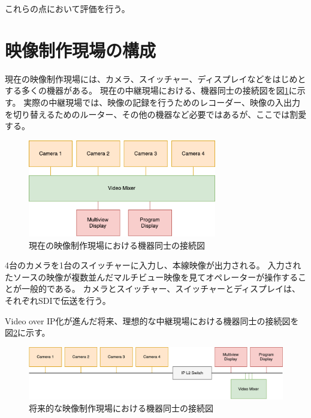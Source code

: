 これらの点において評価を行う。

\section{映像制作現場の構成}

現在の映像制作現場には、カメラ、スイッチャー、ディスプレイなどをはじめとする多くの機器がある。
現在の中継現場における、機器同士の接続図を図\ref{fig:broadcast-diagram-on-sdi}に示す。
実際の中継現場では、映像の記録を行うためのレコーダー、映像の入出力を切り替えるためのルーター、その他の機器など必要ではあるが、ここでは割愛する。

\begin{figure}[htbp]
  \begin{center}
    \includegraphics[bb=0 0 432 222,width=8.233cm]{img/broadcast-diagram-on-sdi.pdf}
  \end{center}
  \caption{現在の映像制作現場における機器同士の接続図}
  \label{fig:broadcast-diagram-on-sdi}
\end{figure}

4台のカメラを1台のスイッチャーに入力し、本線映像が出力される。
入力されたソースの映像が複数並んだマルチビュー映像を見てオペレーターが操作することが一般的である。
カメラとスイッチャー、スイッチャーとディスプレイは、それぞれSDIで伝送を行う。

Video over IP化が進んだ将来、理想的な中継現場における機器同士の接続図を図\ref{fig:broadcast-diagram-on-ip}に示す。

\begin{figure}[htbp]
  \begin{center}
    \includegraphics[bb=0 0 787 161,width=15cm]{img/broadcast-diagram-on-ip.pdf}
  \end{center}
  \caption{将来的な映像制作現場における機器同士の接続図}
  \label{fig:broadcast-diagram-on-ip}
\end{figure}


